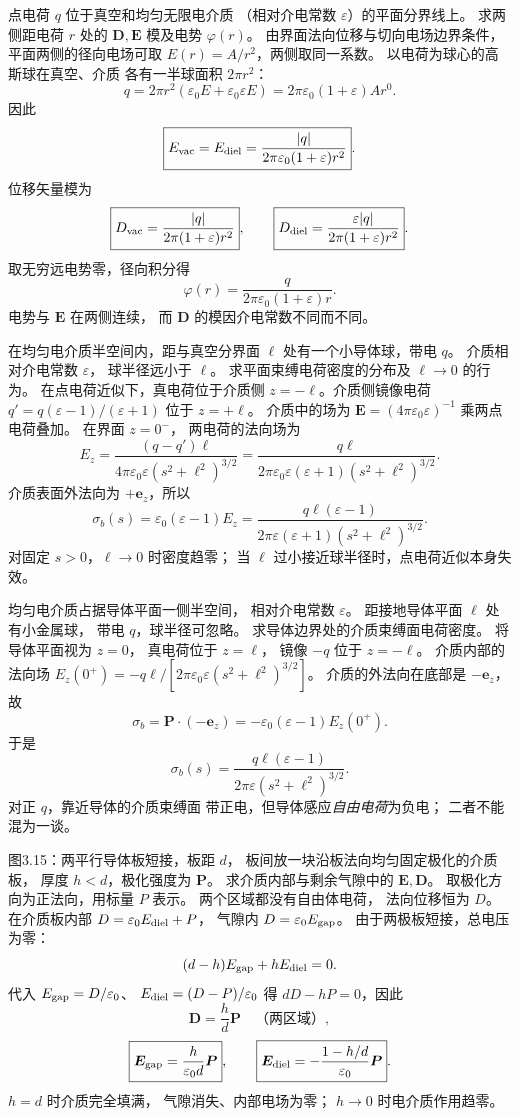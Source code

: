 点电荷 $q$ 位于真空和均匀无限电介质
（相对介电常数 $\varepsilon$）的平面分界线上。
求两侧距电荷 $r$ 处的
$\bm D,\bm E$ 模及电势 $\varphi(r)$。
\exsolution
由界面法向位移与切向电场边界条件，
平面两侧的径向电场可取
$E(r)=A/r^2$，两侧取同一系数。
以电荷为球心的高斯球在真空、介质
各有一半球面积 $2\pi r^2$：
\[
q=2\pi r^2(\varepsilon_0E+
\varepsilon_0\varepsilon E)
=2\pi\varepsilon_0(1+\varepsilon)Ar^0.
\]
因此
\[
\boxed{E_{\rm vac}=E_{\rm diel}
=\frac{|q|}{2\pi\varepsilon_0(1+\varepsilon)r^2}}.
\]
位移矢量模为
\[
\boxed{D_{\rm vac}=\frac{|q|}
{2\pi(1+\varepsilon)r^2}},\qquad
\boxed{D_{\rm diel}=\frac{\varepsilon|q|}
{2\pi(1+\varepsilon)r^2}}.
\]
取无穷远电势零，径向积分得
\[
\boxed{\varphi(r)=
\frac{q}{2\pi\varepsilon_0(1+\varepsilon)r}}.
\]
\excheck 电势与 $\bm E$ 在两侧连续，
而 $\bm D$ 的模因介电常数不同而不同。

在均匀电介质半空间内，距与真空分界面
$\ell$ 处有一个小导体球，带电 $q$。
介质相对介电常数 $\varepsilon$，
球半径远小于 $\ell$。
求平面束缚电荷密度的分布及 $\ell\to0$ 的行为。
\exsolution
在点电荷近似下，真电荷位于介质侧
$z=-\ell$。介质侧镜像电荷
$q'=q(\varepsilon-1)/(\varepsilon+1)$
位于 $z=+\ell$。
介质中的场为
$\bm E=(4\pi\varepsilon_0\varepsilon)^{-1}$
乘两点电荷叠加。
在界面 $z=0^-$，
两电荷的法向场为
\[
E_z=\frac{(q-q')\ell}
{4\pi\varepsilon_0\varepsilon(s^2+\ell^2)^{3/2}}
=\frac{q\ell}
{2\pi\varepsilon_0\varepsilon(\varepsilon+1)
(s^2+\ell^2)^{3/2}}.
\]
介质表面外法向为 $+\bm e_z$，所以
\[
\boxed{\sigma_b(s)=
\varepsilon_0(\varepsilon-1)E_z
=\frac{q\ell(\varepsilon-1)}
{2\pi\varepsilon(\varepsilon+1)
(s^2+\ell^2)^{3/2}}}.
\]
\excheck 对固定 $s>0$，$\ell\to0$ 时密度趋零；
当 $\ell$ 过小接近球半径时，点电荷近似本身失效。

均匀电介质占据导体平面一侧半空间，
相对介电常数 $\varepsilon$。
距接地导体平面 $\ell$ 处有小金属球，
带电 $q$，球半径可忽略。
求导体边界处的介质束缚面电荷密度。
\exsolution
将导体平面视为 $z=0$，
真电荷位于 $z=\ell$，
镜像 $-q$ 位于 $z=-\ell$。
介质内部的法向场
$E_z(0^+)=-q\ell/
[2\pi\varepsilon_0\varepsilon(s^2+\ell^2)^{3/2}]$。
介质的外法向在底部是 $-\bm e_z$，
故
\[
\sigma_b=\bm P\cdot(-\bm e_z)
=-\varepsilon_0(\varepsilon-1)E_z(0^+).
\]
于是
\[
\boxed{\sigma_b(s)=
\frac{q\ell(\varepsilon-1)}
{2\pi\varepsilon(s^2+\ell^2)^{3/2}}}.
\]
\excheck 对正 $q$，靠近导体的介质束缚面
带正电，但导体感应\emph{自由电荷}为负电；
二者不能混为一谈。

图3.15：两平行导体板短接，板距 $d$，
板间放一块沿板法向均匀固定极化的介质板，
厚度 $h<d$，极化强度为 $\bm P$。
求介质内部与剩余气隙中的 $\bm E,\bm D$。
\exsolution
取极化方向为正法向，用标量 $P$ 表示。
两个区域都没有自由体电荷，
法向位移恒为 $D$。
在介质板内部
$D=\varepsilon_0E_{\rm diel}+P$，
气隙内
$D=\varepsilon_0E_{\rm gap}$。
由于两极板短接，总电压为零：
\[
(d-h)E_{\rm gap}+hE_{\rm diel}=0.
\]
代入 $E_{\rm gap}=D/\varepsilon_0$、
$E_{\rm diel}=(D-P)/\varepsilon_0$ 得
$dD-hP=0$，因此
\[
\boxed{\bm D=\frac hd\bm P
\quad\text{（两区域）}},
\]
\[
\boxed{\bm E_{\rm gap}=\frac{h}{\varepsilon_0d}\bm P},
\qquad
\boxed{\bm E_{\rm diel}=
-\frac{1-h/d}{\varepsilon_0}\bm P}.
\]
\excheck $h=d$ 时介质完全填满，
气隙消失、内部电场为零；
$h\to0$ 时电介质作用趋零。

